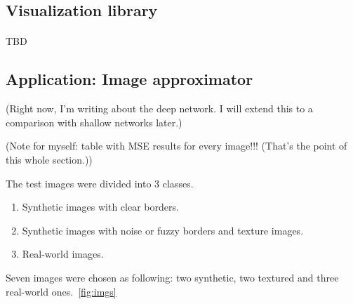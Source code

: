 \documentclass[a4paper]{article}
\begin{document}
\subsection{Visualization library}
\paragraph{}TBD

\subsection{Application: Image approximator}

(Right now, I'm writing about the deep network. I will extend this to a comparison with shallow networks later.)

(Note for myself: table with MSE results for every image!!! (That's the point of this whole section.))

The test images were divided into 3 classes.
\begin{enumerate}
\item Synthetic images with clear borders.
\item Synthetic images with noise or fuzzy borders and texture images.
\item Real-world images.
\end{enumerate}

Seven images were chosen as following: two synthetic, two textured and three real-world ones.~\ref{fig:imgs} 
\end{document}
